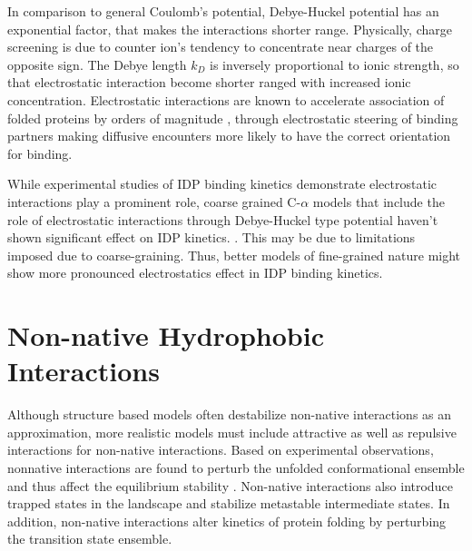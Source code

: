 \documentclass[../talant.diss.submit.tex]{subfiles}
\begin{document}
In comparison to general Coulomb's potential, Debye-Huckel potential has an
exponential factor, that makes the interactions shorter range. Physically, charge
screening is due to counter ion's tendency to concentrate near charges of the
opposite sign. The Debye length $k_D$ is inversely proportional to ionic
strength, so that electrostatic interaction become shorter ranged with increased
ionic concentration.
Electrostatic interactions are known to accelerate association of folded proteins by orders of
magnitude \cite{schreiber:96r,dogan:15b}, through electrostatic steering of
binding partners making diffusive encounters more likely to have the correct
orientation for binding\cite{antosiewicz:96,tan:93,wade:98e}.

While experimental studies of IDP binding kinetics demonstrate electrostatic
interactions play a prominent role\cite{rogers:13,shammas:13},
coarse grained C-$\alpha$ models that include the role of electrostatic interactions
through Debye-Huckel type potential haven't shown significant effect on IDP kinetics.
\cite{ganguly:12e,chu:17r}.
This may be due to limitations imposed due to coarse-graining. Thus, better models
of fine-grained nature might show more pronounced electrostatics effect in IDP binding
kinetics.

%
\section{\textbf{Non-native Hydrophobic Interactions}}\label{sect:two_five}

Although structure based models often destabilize non-native interactions
as an approximation, more realistic models must include attractive as well as repulsive interactions
for non-native interactions. 
Based on experimental observations, nonnative interactions are found to
perturb the unfolded conformational ensemble and thus affect the equilibrium stability
\cite{cho:04t,cho:05m}. Non-native interactions also introduce trapped states in the
landscape and stabilize metastable intermediate states\cite{capaldi:02i,otzen:05a}.
In addition, non-native interactions alter kinetics of protein folding by 
perturbing the transition state ensemble\cite{viguera:02u,di:04d,morton:07e}.
\end{document}
